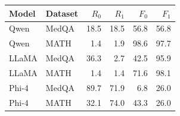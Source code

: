 \begin{tabular}{@{}llrrrr@{}}
\toprule
Model & Dataset & $R_0$ & $R_1$ & $F_0$ & $F_1$ \\
\midrule
Qwen & MedQA & 18.5 & 18.5 & 56.8 & 56.8 \\
Qwen & MATH & 1.4 & 1.9 & 98.6 & 97.7 \\
LLaMA & MedQA & 36.3 & 2.7 & 42.5 & 95.9 \\
LLaMA & MATH & 1.4 & 1.4 & 71.6 & 98.1 \\
Phi-4 & MedQA & 89.7 & 71.9 & 6.8 & 26.0 \\
Phi-4 & MATH & 32.1 & 74.0 & 43.3 & 26.0 \\
\bottomrule
\end{tabular}